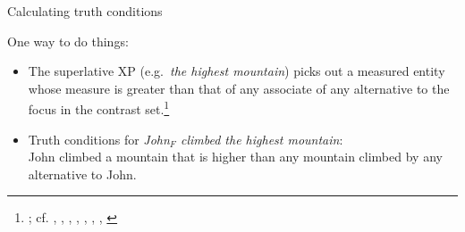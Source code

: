 \documentclass[xcolor=dvipsnames]{beamer}
\begin{document}

\begin{frame}{Calculating truth conditions}

One way to do things:
\begin{itemize}
\item The superlative XP (e.g.\ {\em the highest mountain}) picks
  out a measured entity whose measure is
greater than that of any associate of any alternative to the focus in
the contrast set.\footnote{\citealt{coppock+beaver:salt2014};
  cf. \citealt{heim:1999}, \citealt{hackl:2009},
\citealt{sharvit+stateva:2002}, \citealt{krasikova:2012},
\citealt{gawron:1995}, \citealt{farkas+kiss:2000},
\citealt{gutierrez-rexach:2006}, \citealt{teodorescu:2009}}
\item Truth conditions for {\em John$_F$ climbed the highest mountain}:\\
John climbed a mountain that is higher than any mountain
climbed by any alternative to John.
\end{itemize}



\end{frame}
\end{document}
